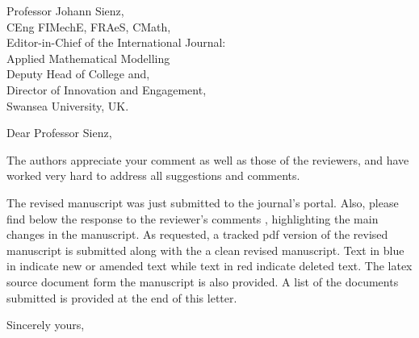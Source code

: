 \documentclass[11pt]{letter} %
\begin{document}

\begin{letter}{Professor Johann Sienz, \\CEng FIMechE, FRAeS, CMath, \\Editor-in-Chief of the International Journal: \\Applied Mathematical Modelling \\Deputy Head of College and, \\Director of Innovation and Engagement, \\
Swansea University, UK.}






\opening{Dear Professor Sienz,} 
 
The authors appreciate your comment as well as those of the reviewers, and have worked very hard to address all suggestions and comments.

The revised manuscript was just submitted to the journal's portal. Also, please find below the response to the reviewer's comments , highlighting the main changes in the manuscript. As requested, a tracked pdf version of the revised manuscript is submitted along with the a clean revised manuscript. Text in blue in indicate new or amended text while text in red indicate deleted text. The latex source document form the manuscript is also provided. A list of the documents submitted is provided at the end of this letter. 

\closing{Sincerely yours,}



\end{letter}
\end{document}
